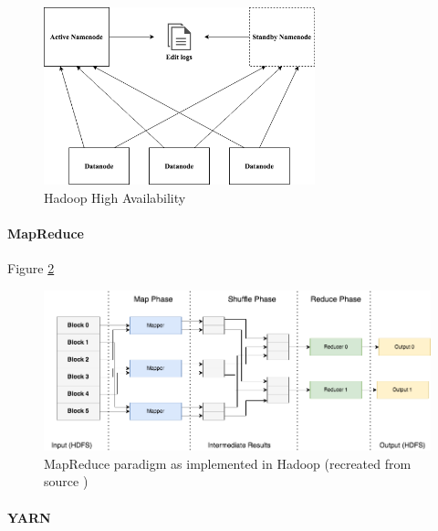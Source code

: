 \documentclass[review]{elsarticle}
\begin{document}
\begin{figure}[h!]
	\centering
	\includegraphics[width=0.7\textwidth]{HadoopHA}
	\caption{Hadoop High Availability}
	\label{fig:HadoopHA}
\end{figure}

\paragraph{MapReduce} Figure \ref{fig:MapReduce}

\begin{figure}[h!]
	\includegraphics[width=\textwidth]{MapReduce}
	\caption{MapReduce paradigm as implemented in Hadoop (recreated from source \cite{schatzle_giant_nodate})}
	\label{fig:MapReduce}
	\centering
\end{figure}

\paragraph{YARN}
\end{document}
